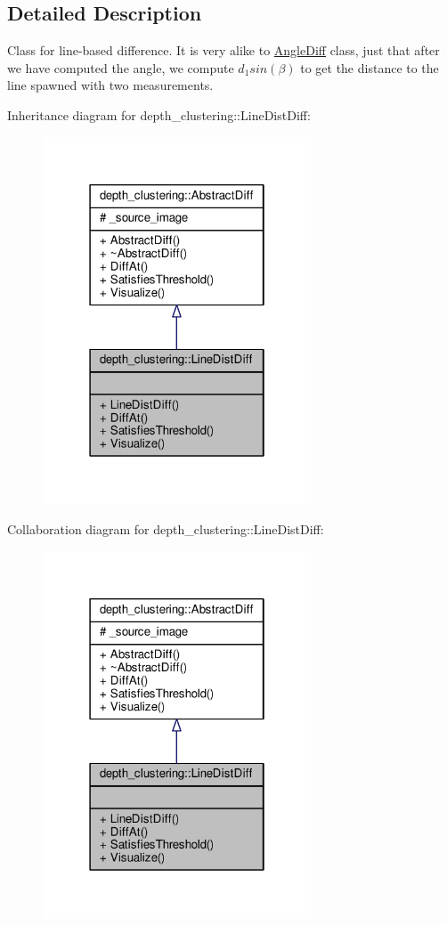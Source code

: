 \subsection{Detailed Description}
Class for line-\/based difference. It is very alike to \hyperlink{classdepth__clustering_1_1AngleDiff}{Angle\-Diff} class, just that after we have computed the angle, we compute $d_1 sin(\beta)$ to get the distance to the line spawned with two measurements. 

Inheritance diagram for depth\-\_\-clustering\-:\-:Line\-Dist\-Diff\-:
\nopagebreak
\begin{figure}[H]
\begin{center}
\leavevmode
\includegraphics[width=226pt]{classdepth__clustering_1_1LineDistDiff__inherit__graph}
\end{center}
\end{figure}


Collaboration diagram for depth\-\_\-clustering\-:\-:Line\-Dist\-Diff\-:
\nopagebreak
\begin{figure}[H]
\begin{center}
\leavevmode
\includegraphics[width=226pt]{classdepth__clustering_1_1LineDistDiff__coll__graph}
\end{center}
\end{figure}


